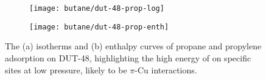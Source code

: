 \begin{figure}[htb]
    \centering
    \begin{subfigure}{0.5\linewidth}
        \texttt{[image: butane/dut-48-prop-log]}%
        \caption{}\label{dut:fgr:dut-48-prop-log}
    \end{subfigure}%
    \begin{subfigure}{0.5\linewidth}
        \texttt{[image: butane/dut-48-prop-enth]}%
        \caption{}\label{dut:fgr:dut-48-prop-enth}
    \end{subfigure}%
    \caption{The (a) isotherms and (b) enthalpy curves of propane 
    and propylene adsorption on DUT-48, highlighting the high energy
    of  on specific sites at low pressure, likely to be 
    \(\pi\)-Cu interactions.}%
    \label{dut:fgr:dut-48-prop}
\end{figure}